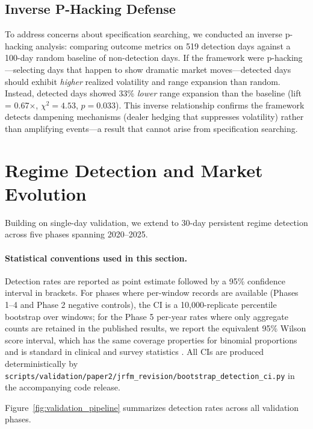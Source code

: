 \subsection{Inverse P-Hacking Defense}

To address concerns about specification searching, we conducted an inverse p-hacking analysis: comparing outcome metrics on 519 detection days against a 100-day random baseline of non-detection days. If the framework were p-hacking---selecting days that happen to show dramatic market moves---detected days should exhibit \textit{higher} realized volatility and range expansion than random. Instead, detected days showed 33\% \textit{lower} range expansion than the baseline (lift = 0.67$\times$, $\chi^2 = 4.53$, $p = 0.033$). This inverse relationship confirms the framework detects dampening mechanisms (dealer hedging that suppresses volatility) rather than amplifying events---a result that cannot arise from specification searching.



\section{Regime Detection and Market Evolution}
\label{sec:regime}

Building on single-day validation, we extend to 30-day persistent regime detection across five phases spanning 2020--2025.

\paragraph{Statistical conventions used in this section.}
Detection rates are reported as point estimate followed by a 95\%
confidence interval in brackets. For phases where per-window records
are available (Phases 1--4 and Phase 2 negative controls), the CI is
a 10{,}000-replicate percentile bootstrap over windows; for the Phase 5
per-year rates where only aggregate counts are retained in the published
results, we report the equivalent 95\% Wilson score interval, which has
the same coverage properties for binomial proportions and is standard in
clinical and survey statistics \citep{brown2001interval}. All CIs are
produced deterministically by
\texttt{scripts/validation/paper2/jrfm\_revision/bootstrap\_detection\_ci.py}
in the accompanying code release.

Figure~\ref{fig:validation_pipeline} summarizes detection rates across all validation phases.

